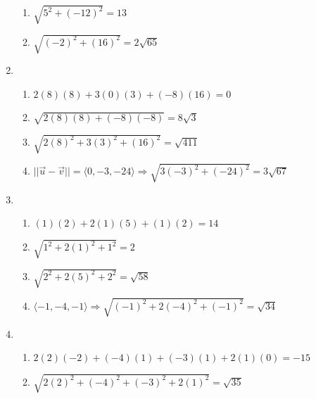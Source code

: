 \documentclass[12pt]{article}
\begin{document}
\begin{enumerate}
\begin{enumerate}
      \item $\sqrt{5^2+(-12)^2}=13$

      \item $\sqrt{(-2)^2+(16)^2}=2\sqrt{65}$

    \end{enumerate}

    \setcounter{enumi}{22}

  \item

    \begin{enumerate}

      \item $2(8)(8)+3(0)(3)+(-8)(16)=0$

      \item $\sqrt{2(8)(8)+(-8)(-8)}=8\sqrt{3}$

      \item $\sqrt{2(8)^2+3(3)^2+(16)^2}=\sqrt{411}$

      \item $||\overrightarrow{u}-\overrightarrow{v}||=\langle0,-3,-24\rangle\Rightarrow \sqrt{3(-3)^2+(-24)^2}=3\sqrt{67}$

    \end{enumerate}

  \item

    \begin{enumerate}

      \item $(1)(2)+2(1)(5)+(1)(2)=14$

      \item $\sqrt{1^2+2(1)^2+1^2}=2$

      \item $\sqrt{2^2+2(5)^2+2^2}=\sqrt{58}$

      \item $\langle-1,-4,-1\rangle\Rightarrow\sqrt{(-1)^2+2(-4)^2+(-1)^2}=\sqrt{34}$

    \end{enumerate}

    \setcounter{enumi}{28}

  \item

    \begin{enumerate}

      \item $2(2)(-2)+(-4)(1)+(-3)(1)+2(1)(0)=-15$

      \item $\sqrt{2(2)^2+(-4)^2+(-3)^2+2(1)^2}=\sqrt{35}$


\end{enumerate}
\end{enumerate}
\end{document}
